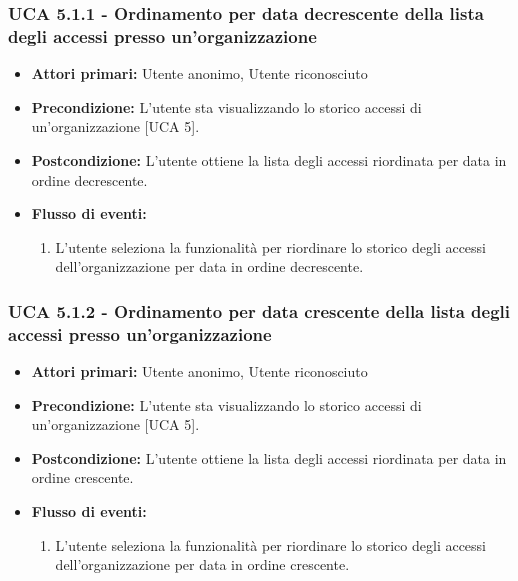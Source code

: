 \subsubsection{UCA 5.1.1 - Ordinamento per data decrescente della lista degli accessi presso un'organizzazione}
\begin{itemize}
	\item \textbf{Attori primari:} Utente anonimo, Utente riconosciuto
	\item \textbf{Precondizione:} L'utente sta visualizzando lo storico accessi di un'organizzazione [UCA 5].
	\item \textbf{Postcondizione:} L'utente ottiene la lista degli accessi riordinata per data in ordine decrescente.
	\item \textbf{Flusso di eventi:}
	\begin{enumerate}
		\item L'utente seleziona la funzionalità per riordinare lo storico degli accessi dell'organizzazione per data in ordine decrescente.
	\end{enumerate}   
\end{itemize}

\subsubsection{UCA 5.1.2 - Ordinamento per data crescente della lista degli accessi presso un'organizzazione}
\begin{itemize}
	\item \textbf{Attori primari:} Utente anonimo, Utente riconosciuto
	\item \textbf{Precondizione:} L'utente sta visualizzando lo storico accessi di un'organizzazione [UCA 5].
	\item \textbf{Postcondizione:} L'utente ottiene la lista degli accessi riordinata per data in ordine crescente.
	\item \textbf{Flusso di eventi:}
	\begin{enumerate}
		\item L'utente seleziona la funzionalità per riordinare lo storico degli accessi dell'organizzazione per data in ordine crescente.
	\end{enumerate}
\end{itemize}

